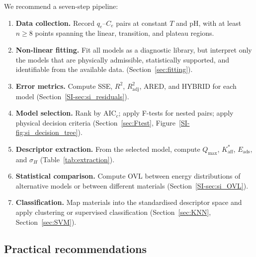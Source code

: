 \documentclass[journal=jacsat,manuscript=article]{achemso}
\begin{document}
	We recommend a seven-step pipeline:
	\begin{enumerate}
		\item \textbf{Data collection.} Record $q_e$--$C_e$ pairs at constant $T$ and pH, with at least $n \geq 8$ points spanning the linear, transition, and plateau regions.
		\item \textbf{Non-linear fitting.} Fit all models as a diagnostic library, but interpret only the models that are physically admissible, statistically supported, and identifiable from the available data. (Section~\ref{sec:fitting}).
		\item \textbf{Error metrics.} Compute SSE, $R^2$, $R^2_{\mathrm{adj}}$, ARED, and HYBRID for each model (Section~\ref{SI-sec:si_residuals}).
		\item \textbf{Model selection.} Rank by AIC$_c$; apply F-tests for nested pairs; apply physical decision criteria (Section~\ref{sec:Ftest}, Figure~\ref{SI-fig:si_decision_tree}).
		\item \textbf{Descriptor extraction.} From the selected model, compute $Q_{\max}$, $K_{\mathrm{aff}}^{\ast}$, $E_{\mathrm{ads}}$, and $\sigma_H$ (Table~\ref{tab:extraction}).
		\item \textbf{Statistical comparison.} Compute OVL between energy distributions of alternative models or between different materials (Section~\ref{SI-sec:si_OVL}).
		\item \textbf{Classification.} Map materials into the standardised descriptor space and apply clustering or supervised classification (Section~\ref{sec:KNN}, Section~\ref{sec:SVM}).
	\end{enumerate}

	\subsection{Practical recommendations}
	\label{sec:practical}
\end{document}
